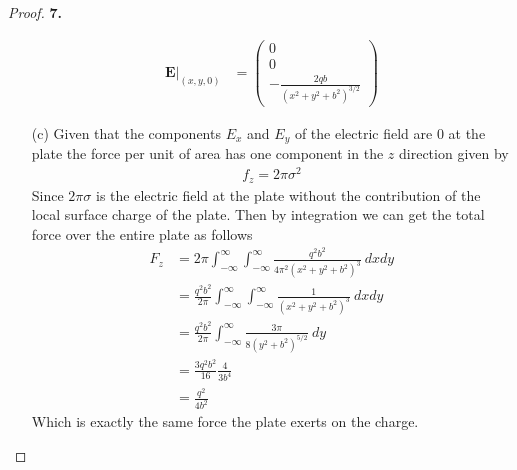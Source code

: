 \documentclass[11pt]{article}
\theoremstyle{definition}
\begin{document}
\begin{proof}{\textbf{7.}}
\begin{itemize}
\begin{align*}
        \bm{E}|_{(x,y,0)} &= \begin{pmatrix}
            0 \\ 0 \\ -\frac{2qb}{(x^2 + y^2 + b^2)^{3/2}}
        \end{pmatrix}
    \end{align*}
\cleardoublepage
    \item [(c)] Given that the components $E_x$ and $E_y$ of the electric field
    are $0$ at the plate the force per unit of area has one component in the
    $z$ direction given by
    \begin{align*}
        f_z = 2\pi \sigma^2
    \end{align*}
    Since $2\pi\sigma$ is the electric field at the plate without the
    contribution of the local surface charge of the plate.
    Then by integration we can get the total force over the entire plate as
    follows
    \begin{align*}
        F_z &= 2\pi \int_{-\infty}^\infty\int_{-\infty}^\infty
        \frac{q^2b^2}{4\pi^2(x^2 + y^2 + b^2)^3}~dxdy\\
        &= \frac{q^2b^2}{2\pi}\int_{-\infty}^\infty\int_{-\infty}^\infty
        \frac{1}{(x^2 + y^2 + b^2)^3}~dxdy\\
        &= \frac{q^2b^2}{2\pi}\int_{-\infty}^\infty
        \frac{3\pi}{8(y^2 + b^2)^{5/2}}~dy\\
        &= \frac{3q^2b^2}{16}\frac{4}{3b^4}\\
        &= \frac{q^2}{4b^2}
    \end{align*}
    Which is exactly the same force the plate exerts on the charge.
\end{itemize}
\end{proof}
\end{document}
